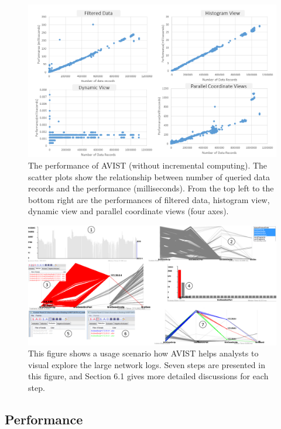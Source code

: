\begin{figure}[htb]
	\centering
	\includegraphics[width=1.0\linewidth]{pic/perf.png}
	\parbox[t]{1.0\columnwidth}{\relax
	}
	\caption{\label{fig:performance}
		The performance of AVIST (without incremental computing). The scatter plots show the relationship between number of queried data records and the performance (milliseconds). From the top left to the bottom right are the performances of filtered data, histogram view, dynamic view and parallel coordinate views (four axes).  }
\end{figure}


\begin{figure}[htb]
	\centering
	\includegraphics[width=0.9\linewidth]{pic/network2.png}
	\parbox[t]{1.0\columnwidth}{\relax
	}
	\caption{\label{fig:vast}
		This figure shows a usage scenario how AVIST helps analysts to visual explore the large network logs. 
		Seven steps are presented in this figure, and Section 6.1 gives more detailed discussions for each step. }
\end{figure}

\subsection{Performance}


